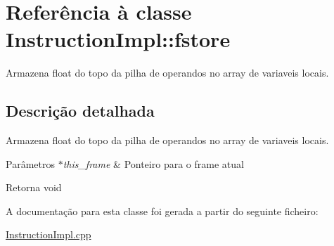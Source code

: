 \hypertarget{class_instruction_impl_1_1fstore}{}\section{Referência à classe Instruction\+Impl\+:\+:fstore}
\label{class_instruction_impl_1_1fstore}


Armazena float do topo da pilha de operandos no array de variaveis locais.  




\subsection{Descrição detalhada}
Armazena float do topo da pilha de operandos no array de variaveis locais. 


\begin{DoxyParams}{Parâmetros}
{\em $\ast$this\+\_\+frame} & Ponteiro para o frame atual \\
\hline
\end{DoxyParams}
\begin{DoxyReturn}{Retorna}
void 
\end{DoxyReturn}


A documentação para esta classe foi gerada a partir do seguinte ficheiro\+:\begin{DoxyCompactItemize}
\item 
\hyperlink{_instruction_impl_8cpp}{Instruction\+Impl.\+cpp}\end{DoxyCompactItemize}
